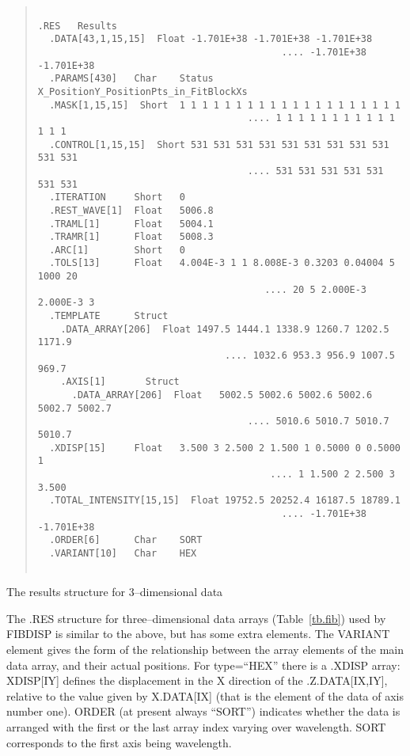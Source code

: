 \begin{table}
\begin{quote}\begin{verbatim}
 
.RES   Results
  .DATA[43,1,15,15]  Float -1.701E+38 -1.701E+38 -1.701E+38
                                           .... -1.701E+38 -1.701E+38
  .PARAMS[430]   Char    Status    X_PositionY_PositionPts_in_FitBlockXs
  .MASK[1,15,15]  Short  1 1 1 1 1 1 1 1 1 1 1 1 1 1 1 1 1 1 1 1
                                     .... 1 1 1 1 1 1 1 1 1 1 1 1 1 1
  .CONTROL[1,15,15]  Short 531 531 531 531 531 531 531 531 531 531 531
                                     .... 531 531 531 531 531 531 531
  .ITERATION     Short   0
  .REST_WAVE[1]  Float   5006.8
  .TRAML[1]      Float   5004.1
  .TRAMR[1]      Float   5008.3
  .ARC[1]        Short   0
  .TOLS[13]      Float   4.004E-3 1 1 8.008E-3 0.3203 0.04004 5 1000 20
                                        .... 20 5 2.000E-3 2.000E-3 3
  .TEMPLATE      Struct
    .DATA_ARRAY[206]  Float 1497.5 1444.1 1338.9 1260.7 1202.5 1171.9
                                 .... 1032.6 953.3 956.9 1007.5 969.7
    .AXIS[1]       Struct
      .DATA_ARRAY[206]  Float   5002.5 5002.6 5002.6 5002.6 5002.7 5002.7
                                     .... 5010.6 5010.7 5010.7 5010.7
  .XDISP[15]     Float   3.500 3 2.500 2 1.500 1 0.5000 0 0.5000 1
                                         .... 1 1.500 2 2.500 3 3.500
  .TOTAL_INTENSITY[15,15]  Float 19752.5 20252.4 16187.5 18789.1
                                           .... -1.701E+38 -1.701E+38
  .ORDER[6]      Char    SORT
  .VARIANT[10]   Char    HEX
 
\end{verbatim}\end{quote}
\caption[a]{The results structure for 3--dimensional data}
\label{tb.fib}
\end{table}

The .RES structure for three--dimensional data arrays
(Table~\ref{tb.fib}) used by FIBDISP is similar to the above, but has
some extra elements.
The VARIANT element gives the form of the relationship between the array
elements of the main data array, and their actual positions.
For type=``HEX'' there is a .XDISP array: XDISP[IY] defines the
displacement in the X direction of the .Z.DATA[IX,IY], relative to the
value given by X.DATA[IX] (that is the element of the data of axis
number one).
ORDER (at present always ``SORT'') indicates whether the data is
arranged with the first or the last array index varying over wavelength.
SORT corresponds to the first axis being wavelength.



